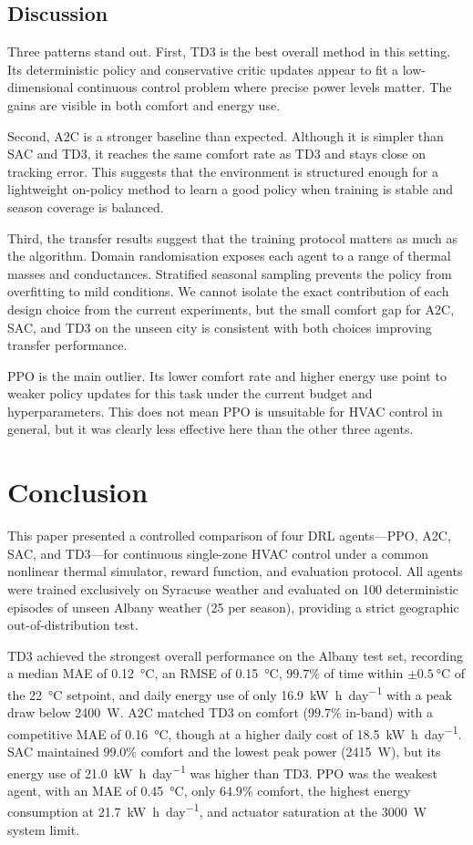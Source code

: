 \documentclass[conference]{IEEEtran}
\begin{document}
\subsection{Discussion}
\label{subsec:discussion}
Three patterns stand out. First, TD3 is the best overall method in this
setting. Its deterministic policy and conservative critic updates appear to
fit a low-dimensional continuous control problem where precise power levels
matter. The gains are visible in both comfort and energy use.

Second, A2C is a stronger baseline than expected. Although it is simpler
than SAC and TD3, it reaches the same comfort rate as TD3 and stays close
on tracking error. This suggests that the environment is structured enough
for a lightweight on-policy method to learn a good policy when training is
stable and season coverage is balanced.

Third, the transfer results suggest that the training protocol matters as
much as the algorithm. Domain randomisation exposes each agent to a range
of thermal masses and conductances. Stratified seasonal sampling prevents
the policy from overfitting to mild conditions. We cannot isolate the exact
contribution of each design choice from the current experiments, but the
small comfort gap for A2C, SAC, and TD3 on the unseen city is consistent
with both choices improving transfer performance.

PPO is the main outlier. Its lower comfort rate and higher energy use point
to weaker policy updates for this task under the current budget and
hyperparameters. This does not mean PPO is unsuitable for HVAC control in
general, but it was clearly less effective here than the other three agents.

\section{Conclusion}
\label{sec:conclusion}
This paper presented a controlled comparison of four DRL agents---PPO, A2C,
SAC, and TD3---for continuous single-zone HVAC control under a common
nonlinear thermal simulator, reward function, and evaluation protocol.
All agents were trained exclusively on Syracuse weather and evaluated on
100 deterministic episodes of unseen Albany weather (25 per season),
providing a strict geographic out-of-distribution test.

TD3 achieved the strongest overall performance on the Albany test set,
recording a median MAE of \SI{0.12}{\degreeCelsius}, an RMSE of
\SI{0.15}{\degreeCelsius}, $99.7\%$ of time within
$\pm\SI{0.5}{\degreeCelsius}$ of the \SI{22}{\degreeCelsius} setpoint,
and daily energy use of only \SI{16.9}{\kilo\watt\hour\per day} with a
peak draw below \SI{2400}{\watt}. A2C matched TD3 on comfort ($99.7\%$
in-band) with a competitive MAE of \SI{0.16}{\degreeCelsius}, though at a
higher daily cost of \SI{18.5}{\kilo\watt\hour\per day}. SAC maintained
$99.0\%$ comfort and the lowest peak power (\SI{2415}{\watt}), but its
energy use of \SI{21.0}{\kilo\watt\hour\per day} was higher than TD3.
PPO was the weakest agent, with an MAE of \SI{0.45}{\degreeCelsius}, only
$64.9\%$ comfort, the highest energy consumption at
\SI{21.7}{\kilo\watt\hour\per day}, and actuator saturation at the
\SI{3000}{\watt} system limit.
\end{document}
